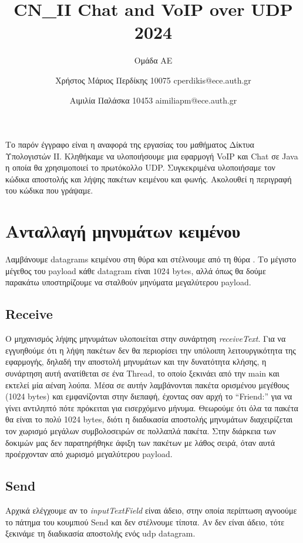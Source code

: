 \documentclass{article}
\title{CN\_II Chat and VoIP over UDP 2024}
\author{\phantom{hehehe they will never see this coming!}Ομάδα ΑΕ\phantom{hehehe they will never see this coming!} \and 
    Χρήστος Μάριος Περδίκης 10075 cperdikis@ece.auth.gr
   \and Αιμιλία Παλάσκα 10453 aimiliapm@ece.auth.gr}
\date{}
\begin{document}
\maketitle

Το παρόν έγγραφο είναι η αναφορά της εργασίας του μαθήματος Δίκτυα Υπολογιστών 
ΙΙ. Κληθήκαμε να υλοποιήσουμε μια εφαρμογή VoIP και Chat σε Java η οποία θα
χρησιμοποιεί το πρωτόκολλο UDP. Συγκεκριμένα υλοποιήσαμε τον κώδικα αποστολής 
και λήψης πακέτων κειμένου και φωνής. Ακολουθεί η περιγραφή του κώδικα που γράψαμε.

\section{Ανταλλαγή μηνυμάτων κειμένου}
Λαμβάνουμε datagrams κειμένου στη θύρα \textdestport{} και στέλνουμε από τη θύρα 
\textdestport. Το μέγιστο μέγεθος του payload κάθε datagram είναι $1024$ bytes, αλλά όπως θα 
δούμε παρακάτω υποστηρίζουμε να σταλθούν μηνύματα μεγαλύτερου payload.

\subsection{Receive}
Ο μηχανισμός λήψης μηνυμάτων υλοποιείται στην συνάρτηση \textit{receiveText}.
Για να εγγυηθούμε ότι η λήψη πακέτων δεν θα περιορίσει την υπόλοιπη λειτουργικότητα της
εφαρμογής, δηλαδή την αποστολή μηνυμάτων και την δυνατότητα κλήσης, η συνάρτηση αυτή
ανατίθεται σε ένα Thread, το οποίο ξεκινάει από την main και εκτελεί μία αέναη λούπα. 
Μέσα σε αυτήν λαμβάνονται πακέτα ορισμένου μεγέθους (1024 bytes) και εμφανίζονται στην
διεπαφή, έχοντας σαν αρχή το ``Friend:'' για να γίνει αντιληπτό πότε πρόκειται για εισερχόμενο
μήνυμα. Θεωρούμε ότι όλα τα πακέτα θα είναι το πολύ 1024 bytes, διότι η διαδικασία
αποστολής μηνυμάτων διαχειρίζεται τον χωρισμό μεγάλων συμβολοσειρών σε πολλαπλά πακέτα.
Στην διάρκεια των δοκιμών μας δεν παρατηρήθηκε άφιξη των πακέτων με λάθος σειρά, όταν αυτά
προέρχονταν από χωρισμό μεγαλύτερου payload. 

\subsection{Send}
Αρχικά ελέγχουμε αν το \textit{inputTextField} είναι άδειο, στην οποία 
περίπτωση αγνοούμε το πάτημα του κουμπιού Send και δεν στέλνουμε τίποτα. 
Αν δεν είναι άδειο, τότε ξεκινάμε τη διαδικασία αποστολής ενός udp datagram.
\end{document}
